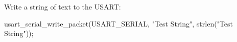 \begin{DoxyEnumerate}
\item Write a string of text to the U\+S\+A\+R\+T\+:
\begin{DoxyItemize}
\item 
\begin{DoxyCode}
usart\_serial\_write\_packet(USART\_SERIAL, \textcolor{stringliteral}{"Test String"}, strlen(\textcolor{stringliteral}{"Test String"})); 
\end{DoxyCode}
 
\end{DoxyItemize}
\end{DoxyEnumerate}